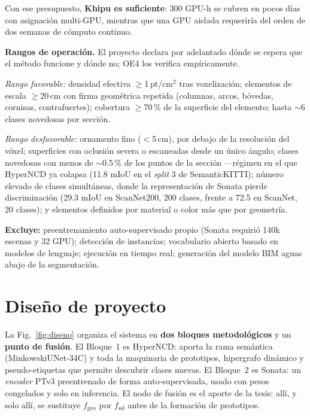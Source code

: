 \documentclass[9pt,twocolumn,a4paper]{extarticle}
\begin{document}
Con ese presupuesto, \textbf{Khipu es suficiente}: 300 GPU-h se cubren en
pocos días con asignación multi-GPU, mientras que una GPU aislada requeriría
del orden de dos semanas de cómputo continuo.

\textbf{Rangos de operación.} El proyecto declara por adelantado dónde se
espera que el método funcione y dónde no; OE4 los verifica empíricamente.

\emph{Rango favorable:} densidad efectiva $\geq$1\,pt/cm$^2$ tras
voxelización; elementos de escala $\geq$20\,cm con firma geométrica repetida
(columnas, arcos, bóvedas, cornisas, contrafuertes); cobertura
$\geq$70\,\% de la superficie del elemento; hasta $\sim$6 clases novedosas
por sección.

\emph{Rango desfavorable:} ornamento fino ($<$5\,cm), por debajo de la
resolución del vóxel; superficies con oclusión severa o escaneadas desde un
único ángulo; clases novedosas con menos de $\sim$0.5\,\% de los puntos de la
sección ---régimen en el que HyperNCD ya colapsa (11.8 mIoU en el
\emph{split} 3 de SemanticKITTI); número elevado de clases simultáneas, donde
la representación de Sonata pierde discriminación (29.3 mIoU en ScanNet200,
200 clases, frente a 72.5 en ScanNet, 20 clases); y elementos definidos por
material o color más que por geometría.

\textbf{Excluye:} preentrenamiento auto-supervisado propio (Sonata requirió
140k escenas y 32 GPU); detección de instancias; vocabulario abierto basado
en modelos de lenguaje; ejecución en tiempo real; generación del modelo BIM
aguas abajo de la segmentación.

\section{Diseño de proyecto}
La Fig.~\ref{fig:diseno} organiza el sistema en \textbf{dos bloques
metodológicos} y un \textbf{punto de fusión}. El Bloque~1 es HyperNCD: aporta
la rama semántica (MinkowskiUNet-34C) y toda la maquinaria de prototipos,
hipergrafo dinámico y pseudo-etiquetas que permite descubrir clases nuevas.
El Bloque~2 es Sonata: un \emph{encoder} PTv3 preentrenado de forma
auto-supervisada, usado con pesos congelados y solo en inferencia. El nodo de
fusión es el aporte de la tesis: allí, y solo allí, se sustituye
$f_{\mathrm{geo}}$ por $f_{\mathrm{ssl}}$ antes de la formación de
prototipos.
\end{document}
